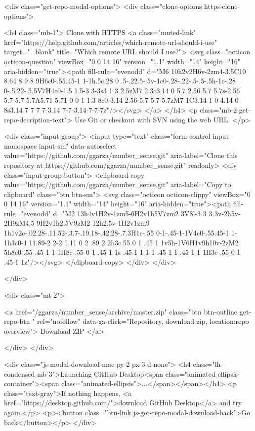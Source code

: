       <div class="get-repo-modal-options">
          <div class="clone-options https-clone-options">

            <h4 class="mb-1">
              Clone with HTTPS
              <a class="muted-link" href="https://help.github.com/articles/which-remote-url-should-i-use" target="_blank" title="Which remote URL should I use?">
                <svg class="octicon octicon-question" viewBox="0 0 14 16" version="1.1" width="14" height="16" aria-hidden="true"><path fill-rule="evenodd" d="M6 10h2v2H6v-2zm4-3.5C10 8.64 8 9 8 9H6c0-.55.45-1 1-1h.5c.28 0 .5-.22.5-.5v-1c0-.28-.22-.5-.5-.5h-1c-.28 0-.5.22-.5.5V7H4c0-1.5 1.5-3 3-3s3 1 3 2.5zM7 2.3c3.14 0 5.7 2.56 5.7 5.7s-2.56 5.7-5.7 5.7A5.71 5.71 0 0 1 1.3 8c0-3.14 2.56-5.7 5.7-5.7zM7 1C3.14 1 0 4.14 0 8s3.14 7 7 7 7-3.14 7-7-3.14-7-7-7z"/></svg>
              </a>
            </h4>
            <p class="mb-2 get-repo-decription-text">
              Use Git or checkout with SVN using the web URL.
            </p>

            <div class="input-group">
  <input type="text" class="form-control input-monospace input-sm" data-autoselect value="https://github.com/ggarza/number_sense.git" aria-label="Clone this repository at https://github.com/ggarza/number_sense.git" readonly>
  <div class="input-group-button">
    <clipboard-copy value="https://github.com/ggarza/number_sense.git" aria-label="Copy to clipboard" class="btn btn-sm">
      <svg class="octicon octicon-clippy" viewBox="0 0 14 16" version="1.1" width="14" height="16" aria-hidden="true"><path fill-rule="evenodd" d="M2 13h4v1H2v-1zm5-6H2v1h5V7zm2 3V8l-3 3 3 3v-2h5v-2H9zM4.5 9H2v1h2.5V9zM2 12h2.5v-1H2v1zm9 1h1v2c-.02.28-.11.52-.3.7-.19.18-.42.28-.7.3H1c-.55 0-1-.45-1-1V4c0-.55.45-1 1-1h3c0-1.11.89-2 2-2 1.11 0 2 .89 2 2h3c.55 0 1 .45 1 1v5h-1V6H1v9h10v-2zM2 5h8c0-.55-.45-1-1-1H8c-.55 0-1-.45-1-1s-.45-1-1-1-1 .45-1 1-.45 1-1 1H3c-.55 0-1 .45-1 1z"/></svg>
    </clipboard-copy>
  </div>
</div>

          </div>

        <div class="mt-2">
          
<a href="/ggarza/number_sense/archive/master.zip"
   class="btn btn-outline get-repo-btn
"
   rel="nofollow"
   data-ga-click="Repository, download zip, location:repo overview">
  Download ZIP
</a>

        </div>
      </div>

      <div class="js-modal-download-mac py-2 px-3 d-none">
        <h4 class="lh-condensed mb-3">Launching GitHub Desktop<span class="animated-ellipsis-container"><span class="animated-ellipsis">...</span></span></h4>
        <p class="text-gray">If nothing happens, <a href="https://desktop.github.com/">download GitHub Desktop</a> and try again.</p>
        <p><button class="btn-link js-get-repo-modal-download-back">Go back</button></p>
      </div>


